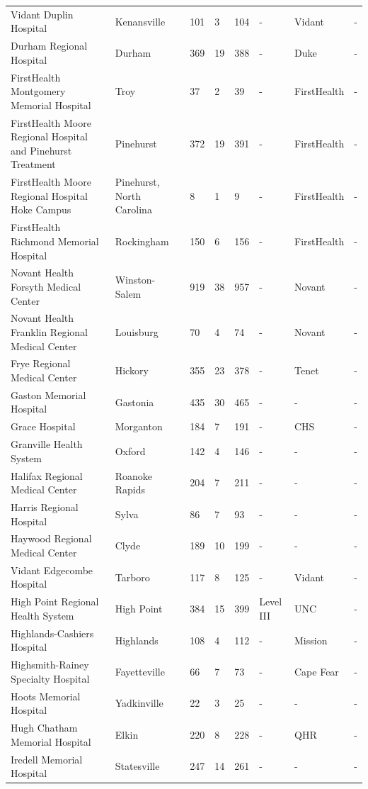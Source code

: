 \documentclass{article}
\begin{document}
\begin{tabular}{llllllll}
Vidant Duplin Hospital & Kenansville & 101 & 3 & 104 & - & Vidant & - \\
Durham Regional Hospital & Durham & 369 & 19 & 388 & - & Duke & - \\
FirstHealth Montgomery Memorial Hospital & Troy & 37 & 2 & 39 & - & FirstHealth & - \\
FirstHealth Moore Regional Hospital and Pinehurst Treatment & Pinehurst & 372 & 19 & 391 & - & FirstHealth & - \\
FirstHealth Moore Regional Hospital Hoke Campus & Pinehurst, North Carolina & 8 & 1 & 9 & - & FirstHealth & - \\
FirstHealth Richmond Memorial Hospital & Rockingham & 150 & 6 & 156 & - & FirstHealth & - \\
Novant Health Forsyth Medical Center & Winston-Salem & 919 & 38 & 957 & - & Novant & - \\
Novant Health Franklin Regional Medical Center & Louisburg & 70 & 4 & 74 & - & Novant & - \\
Frye Regional Medical Center & Hickory & 355 & 23 & 378 & - & Tenet & - \\
Gaston Memorial Hospital & Gastonia & 435 & 30 & 465 & - & - & - \\
Grace Hospital & Morganton & 184 & 7 & 191 & - & CHS & - \\
Granville Health System & Oxford & 142 & 4 & 146 & - & - & - \\
Halifax Regional Medical Center & Roanoke Rapids & 204 & 7 & 211 & - & - & - \\
Harris Regional Hospital & Sylva & 86 & 7 & 93 & - & - & - \\
Haywood Regional Medical Center & Clyde & 189 & 10 & 199 & - & - & - \\
Vidant Edgecombe Hospital & Tarboro & 117 & 8 & 125 & - & Vidant & - \\
High Point Regional Health System & High Point & 384 & 15 & 399 & Level III & UNC & - \\
Highlands-Cashiers Hospital & Highlands & 108 & 4 & 112 & - & Mission & - \\
Highsmith-Rainey Specialty Hospital & Fayetteville & 66 & 7 & 73 & - & Cape Fear & - \\
Hoots Memorial Hospital & Yadkinville & 22 & 3 & 25 & - & - & - \\
Hugh Chatham Memorial Hospital & Elkin & 220 & 8 & 228 & - & QHR & - \\
Iredell Memorial Hospital & Statesville & 247 & 14 & 261 & - & - & - \\

\end{tabular}
\end{document}
